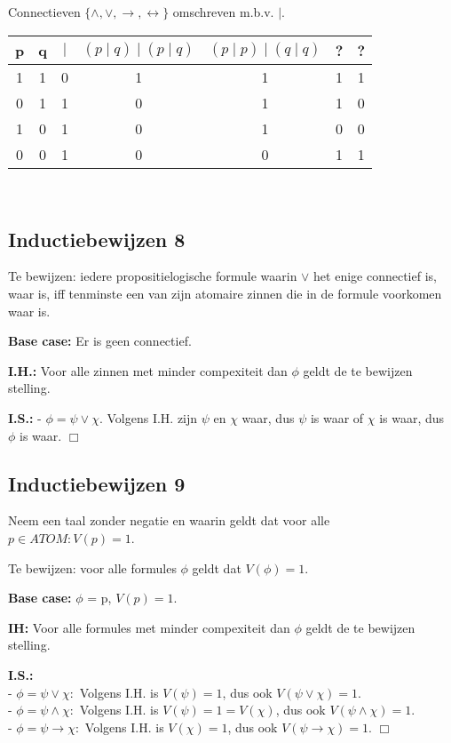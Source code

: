 \documentclass[11pt]{article}
\begin{document}
\bigskip

Connectieven $\{\wedge, \vee, \rightarrow, \leftrightarrow\}$ omschreven m.b.v.
$\mid$. \\

\begin{tabular}{ccc|c|c|c|c}
p & q & $\mid$
  & $(p \mid q) \mid (p \mid q)$
  & $(p \mid p) \mid (q \mid q)$
  & ?
  & ? \\
\hline
1 & 1 & 0  & 1 & 1  & 1 & 1 \\
0 & 1 & 1  & 0 & 1  & 1 & 0 \\
1 & 0 & 1  & 0 & 1  & 0 & 0 \\
0 & 0 & 1  & 0 & 0  & 1 & 1 \\
\end{tabular}
\\

\subsection*{Inductiebewijzen 8}
Te bewijzen: iedere propositielogische formule waarin $\vee$ het enige
connectief is, waar is, iff tenminste een van zijn atomaire zinnen die in de
formule voorkomen waar is.

\textbf{Base case:} Er is geen connectief.

\textbf{I.H.:} Voor alle zinnen met minder compexiteit dan $\phi$ geldt de te
bewijzen stelling.

\textbf{I.S.:} - $\phi = \psi \vee \chi$. Volgens I.H. zijn $\psi$ en $\chi$
waar, dus $\psi$ is waar of $\chi$ is waar, dus $\phi$ is waar.
\hfill $\Box$

\subsection*{Inductiebewijzen 9}
Neem een taal zonder negatie en waarin geldt dat voor alle $p\in ATOM:V(p)=1$.
\smallskip

Te bewijzen: voor alle formules $\phi$ geldt dat $V(\phi)=1$.

\textbf{Base case:} $\phi$ = p, $V(p)=1$.

\textbf{IH:} Voor alle formules met minder compexiteit dan $\phi$ geldt de te
bewijzen stelling.

\textbf{I.S.:} \\
- $\phi = \psi \vee \chi:$ Volgens I.H. is $V(\psi)=1$, dus ook $V(\psi \vee
\chi)=1$.\\
- $\phi = \psi \wedge \chi:$ Volgens I.H. is $V(\psi)=1=V(\chi)$, dus ook $V
(\psi \wedge \chi)=1$.\\
- $\phi = \psi \rightarrow \chi:$ Volgens I.H. is $V(\chi)=1$, dus ook $V(\psi
\rightarrow \chi)=1$.
\hfill $\Box$
\end{document}
